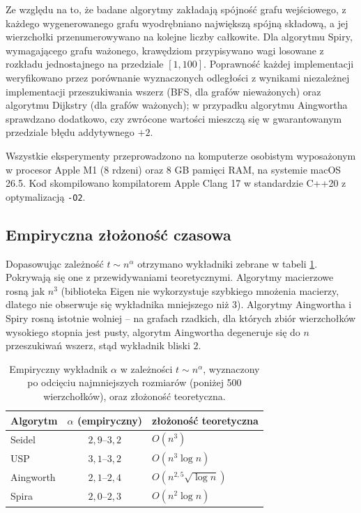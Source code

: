 Ze względu na to, że badane algorytmy zakładają spójność grafu wejściowego,
z każdego wygenerowanego grafu wyodrębniano największą spójną składową,
a jej wierzchołki przenumerowywano na kolejne liczby całkowite. Dla algorytmu
Spiry, wymagającego grafu ważonego, krawędziom przypisywano wagi losowane
z rozkładu jednostajnego na przedziale $[1, 100]$. Poprawność każdej implementacji
weryfikowano przez porównanie wyznaczonych odległości z wynikami niezależnej
implementacji przeszukiwania wszerz (BFS, dla grafów nieważonych) oraz algorytmu
Dijkstry (dla grafów ważonych); w przypadku algorytmu Aingwortha sprawdzano
dodatkowo, czy zwrócone wartości mieszczą się w gwarantowanym przedziale błędu
addytywnego $+2$.

Wszystkie eksperymenty przeprowadzono na komputerze osobistym wyposażonym
w procesor Apple M1 (8 rdzeni) oraz 8 GB pamięci RAM, na systemie macOS 26.5. Kod skompilowano kompilatorem Apple Clang 17 w standardzie
C++20 z optymalizacją \texttt{-O2}.

\subsection{Empiryczna złożoność czasowa}

Dopasowując zależność $t \sim n^{\alpha}$
otrzymano wykładniki zebrane w tabeli \ref{tab:exponents}. Pokrywają się one
z przewidywaniami teoretycznymi. Algorytmy macierzowe rosną jak $n^3$
(biblioteka Eigen nie wykorzystuje szybkiego mnożenia macierzy, dlatego nie
obserwuje się wykładnika mniejszego niż $3$). Algorytmy Aingwortha i Spiry rosną
istotnie wolniej -- na grafach rzadkich, dla których zbiór wierzchołków wysokiego
stopnia jest pusty, algorytm Aingwortha degeneruje się do $n$ przeszukiwań wszerz,
stąd wykładnik bliski $2$.

\begin{table}[H]
\centering
\caption{Empiryczny wykładnik $\alpha$ w zależności $t \sim n^{\alpha}$,
         wyznaczony po odcięciu najmniejszych rozmiarów (poniżej 500 wierzchołków), oraz złożoność teoretyczna.}
\label{tab:exponents}
\begin{tabular}{lcl}
\toprule
Algorytm & $\alpha$ (empiryczny) & złożoność teoretyczna \\
\midrule
Seidel    & $2{,}9$--$3{,}2$ & $O(n^3)$ \\
USP       & $3{,}1$--$3{,}2$ & $O(n^3 \log n)$ \\
Aingworth & $2{,}1$--$2{,}4$ & $O(n^{2{,}5}\sqrt{\log n})$ \\
Spira     & $2{,}0$--$2{,}3$ & $O(n^2 \log n)$  \\
\bottomrule
\end{tabular}
\end{table}

